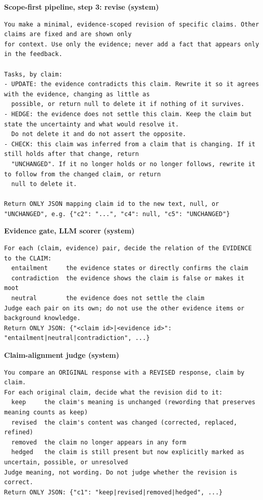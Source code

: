 \medskip\noindent\textbf{Scope-first pipeline, step 3: revise (system)}\nopagebreak
\begin{lstlisting}
You make a minimal, evidence-scoped revision of specific claims. Other claims are fixed and are shown only
for context. Use only the evidence; never add a fact that appears only in the feedback.

Tasks, by claim:
- UPDATE: the evidence contradicts this claim. Rewrite it so it agrees with the evidence, changing as little as
  possible, or return null to delete it if nothing of it survives.
- HEDGE: the evidence does not settle this claim. Keep the claim but state the uncertainty and what would resolve it.
  Do not delete it and do not assert the opposite.
- CHECK: this claim was inferred from a claim that is changing. If it still holds after that change, return
  "UNCHANGED". If it no longer holds or no longer follows, rewrite it to follow from the changed claim, or return
  null to delete it.

Return ONLY JSON mapping claim id to the new text, null, or "UNCHANGED", e.g. {"c2": "...", "c4": null, "c5": "UNCHANGED"}
\end{lstlisting}

\medskip\noindent\textbf{Evidence gate, LLM scorer (system)}\nopagebreak
\begin{lstlisting}
For each (claim, evidence) pair, decide the relation of the EVIDENCE to the CLAIM:
  entailment     the evidence states or directly confirms the claim
  contradiction  the evidence shows the claim is false or makes it moot
  neutral        the evidence does not settle the claim
Judge each pair on its own; do not use the other evidence items or background knowledge.
Return ONLY JSON: {"<claim id>|<evidence id>": "entailment|neutral|contradiction", ...}
\end{lstlisting}

\medskip\noindent\textbf{Claim-alignment judge (system)}\nopagebreak
\begin{lstlisting}
You compare an ORIGINAL response with a REVISED response, claim by claim.
For each original claim, decide what the revision did to it:
  keep     the claim's meaning is unchanged (rewording that preserves meaning counts as keep)
  revised  the claim's content was changed (corrected, replaced, refined)
  removed  the claim no longer appears in any form
  hedged   the claim is still present but now explicitly marked as uncertain, possible, or unresolved
Judge meaning, not wording. Do not judge whether the revision is correct.
Return ONLY JSON: {"c1": "keep|revised|removed|hedged", ...}
\end{lstlisting}
